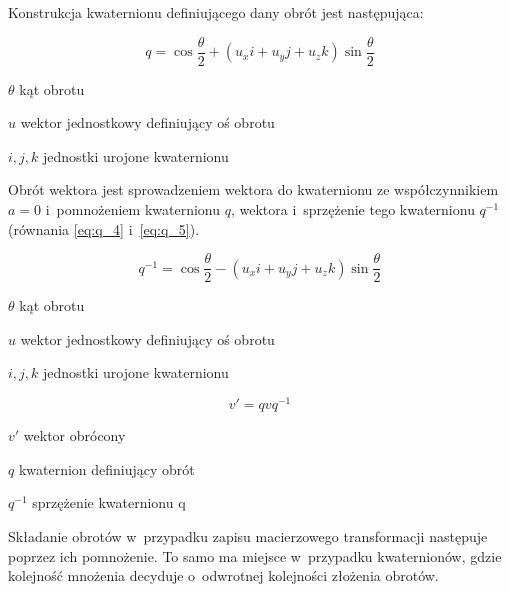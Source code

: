 Konstrukcja kwaternionu definiującego dany obrót jest następująca:
\begin{samepage}
    \begin{equation}
        \label{eq:q_3}
        q = \cos{\frac{\theta}{2}} + (u_xi+u_yj+u_zk)\sin{\frac{\theta}{2}}
    \end{equation}
    \begin{eqexpl}[25mm]
        \item {$\theta$} kąt obrotu
        \item {$u$} wektor jednostkowy definiujący oś obrotu
        \item {$i, j, k$} jednostki urojone kwaternionu
    \end{eqexpl}
    \vspace{\baselineskip}
\end{samepage}

Obrót wektora jest sprowadzeniem wektora do kwaternionu ze współczynnikiem $a = 0$ i~pomnożeniem kwaternionu $q$, wektora i~sprzężenie tego kwaternionu $q^{-1}$ (równania \ref{eq:q_4} i~\ref{eq:q_5}). 

\begin{samepage}
    \begin{equation}
        \label{eq:q_4}
        q^{-1} = \cos{\frac{\theta}{2}} - (u_xi+u_yj+u_zk)\sin{\frac{\theta}{2}}
    \end{equation}
    \begin{eqexpl}[25mm]
        \item {$\theta$} kąt obrotu
        \item {$u$} wektor jednostkowy definiujący oś obrotu
        \item {$i, j, k$} jednostki urojone kwaternionu
    \end{eqexpl}
\end{samepage}

\begin{samepage}
    \begin{equation}
        \label{eq:q_5}
        v' = qvq^{-1}
    \end{equation}
    \begin{eqexpl}[25mm]
        \item {$v'$} wektor obrócony
        \item {$q$} kwaternion definiujący obrót
        \item {$q^{-1}$} sprzężenie kwaternionu q
    \end{eqexpl}
    \vspace{\baselineskip}
\end{samepage}
Składanie obrotów w~przypadku zapisu macierzowego transformacji następuje poprzez ich pomnożenie. To samo ma miejsce w~przypadku kwaternionów, gdzie kolejność mnożenia decyduje o~odwrotnej kolejności złożenia obrotów.

